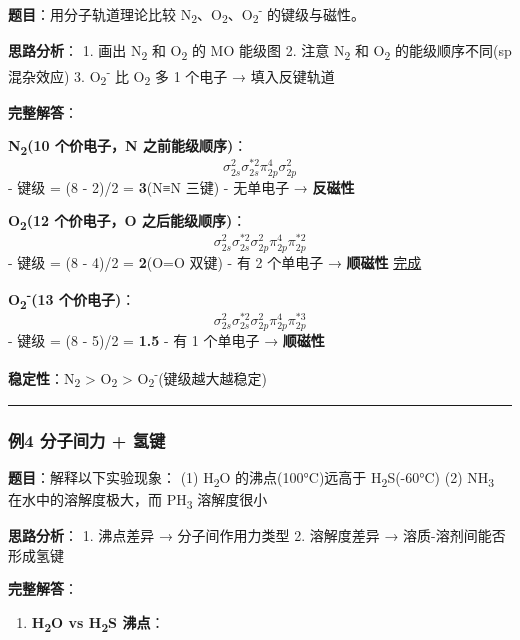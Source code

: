 \textbf{题目}：用分子轨道理论比较 N\textsubscript{2}、O\textsubscript{2}、O\textsubscript{2}\textsuperscript{-} 的键级与磁性。

\textbf{思路分析}：
1. 画出 N\textsubscript{2} 和 O\textsubscript{2} 的 MO 能级图
2. 注意 N\textsubscript{2} 和 O\textsubscript{2} 的能级顺序不同(sp 混杂效应)
3. O\textsubscript{2}\textsuperscript{-} 比 O\textsubscript{2} 多 1 个电子 → 填入反键轨道

\textbf{完整解答}：

\textbf{N\textsubscript{2}(10 个价电子，N 之前能级顺序)}：
\[
\sigma_{2s}^2 \sigma_{2s}^{*2} \pi_{2p}^4 \sigma_{2p}^2
\]
- 键级 = (8 - 2)/2 = \textbf{3}(N≡N 三键)
- 无单电子 → \textbf{反磁性}

\textbf{O\textsubscript{2}(12 个价电子，O 之后能级顺序)}：
\[
\sigma_{2s}^2 \sigma_{2s}^{*2} \sigma_{2p}^2 \pi_{2p}^4 \pi_{2p}^{*2}
\]
- 键级 = (8 - 4)/2 = \textbf{2}(O=O 双键)
- 有 2 个单电子 → \textbf{顺磁性} \href{实验证实！}{完成}

\textbf{O\textsubscript{2}\textsuperscript{-}(13 个价电子)}：
\[
\sigma_{2s}^2 \sigma_{2s}^{*2} \sigma_{2p}^2 \pi_{2p}^4 \pi_{2p}^{*3}
\]
- 键级 = (8 - 5)/2 = \textbf{1.5}
- 有 1 个单电子 → \textbf{顺磁性}

\textbf{稳定性}：N\textsubscript{2} \textgreater{} O\textsubscript{2} \textgreater{} O\textsubscript{2}\textsuperscript{-}(键级越大越稳定)

\begin{center}\rule{0.5\linewidth}{0.5pt}\end{center}

\subsubsection{例4 分子间力 + 氢键}\label{ux4f8b4-ux5206ux5b50ux95f4ux529b-ux6c22ux952e}

\textbf{题目}：解释以下实验现象：
(1) H\textsubscript{2}O 的沸点(100°C)远高于 H\textsubscript{2}S(-60°C)
(2) NH\textsubscript{3} 在水中的溶解度极大，而 PH\textsubscript{3} 溶解度很小

\textbf{思路分析}：
1. 沸点差异 → 分子间作用力类型
2. 溶解度差异 → 溶质-溶剂间能否形成氢键

\textbf{完整解答}：

\begin{enumerate}
\def\labelenumi{(\arabic{enumi})}
\tightlist
\item
  \textbf{H\textsubscript{2}O vs H\textsubscript{2}S 沸点}：
\end{enumerate}

